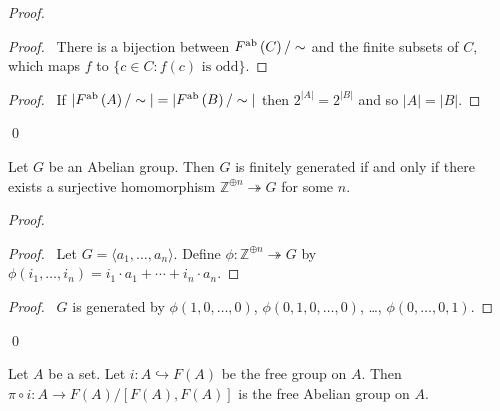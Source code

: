 \begin{proof}
    \pf
    \begin{proof}
        \pf\ There is a bijection between $F^{\mathrm{ab}} \left( {C} \right)/\sim$ and the finite subsets of $C$, which maps $f$ to $\{ c \in C : f(c) \text{ is odd} \}$.
    \end{proof}
    \begin{proof}
        \pf\ If $|F^{\mathrm{ab}} \left( {A} \right)/\sim| = |F^{\mathrm{ab}} \left( {B} \right) / \sim|$ then $2^{|A|} = 2^{|B|}$ and so $|A| = |B|$.
    \end{proof}
    \qed
\end{proof}

\begin{prop}
Let $G$ be an Abelian group. Then $G$ is finitely generated if and only if there exists a surjective homomorphism $\mathbb{Z}^{\oplus n} \twoheadrightarrow G$ for some $n$.
\end{prop}

\begin{proof}
\pf
{}
\begin{proof}
	\pf\ Let $G = \langle a_1, \ldots, a_n \rangle$. Define $\phi : \mathbb{Z}^{\oplus n} \twoheadrightarrow G$ by $\phi(i_1, \ldots, i_n) = i_1 \cdot a_1 + \cdots + i_n \cdot a_n$.
\end{proof}
\begin{proof}
	\pf\ $G$ is generated by $\phi(1, 0, \ldots, 0)$, $\phi(0, 1, 0, \ldots, 0)$, \ldots, $\phi(0, \ldots, 0, 1)$.
\end{proof}
\qed
\end{proof}

\begin{prop}
Let $A$ be a set. Let $i : A \hookrightarrow F(A)$ be the free group on $A$. Then $\pi \circ i : A \rightarrow F(A) / [F(A),F(A)]$ is the free Abelian group on $A$.
\end{prop}

